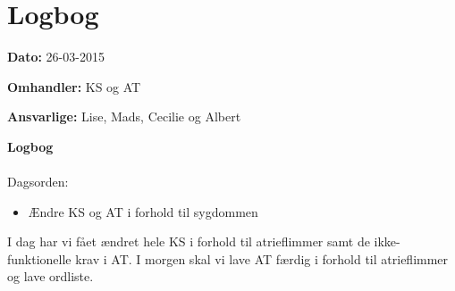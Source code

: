 \chapter{Logbog}

\textbf{Dato:} 26-03-2015

\textbf{Omhandler:} KS og AT 

\textbf{Ansvarlige:} Lise, Mads, Cecilie og Albert
 
\textbf{Logbog}
\\
\\
Dagsorden:
\begin{itemize}
	\item Ændre KS og AT i forhold til sygdommen
\end{itemize}

I dag har vi fået ændret hele KS i forhold til atrieflimmer samt de ikke-funktionelle krav i AT. 
I morgen skal vi lave AT færdig i forhold til atrieflimmer og lave ordliste. 